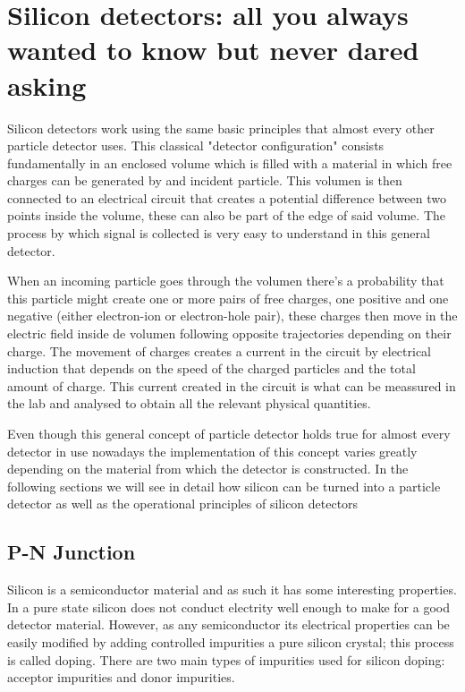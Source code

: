 \chapter{Silicon detectors: all you always wanted to know but never dared asking} %
\label{cha:simulator_development}

Silicon detectors work using the same basic principles that almost every other particle detector uses. This classical "detector configuration" consists fundamentally in an enclosed volume which is filled with a material in which free charges can be generated by and incident particle. This volumen is then connected to an electrical circuit that creates a  potential difference between two points inside the volume, these can also be part of the edge of said volume. The process by which signal is collected is very easy to understand in this general detector.

When an incoming particle goes through the volumen there's a probability that this particle might create one or more pairs of free charges, one positive and one negative (either electron-ion or electron-hole pair), these charges then move in the electric field inside de volumen following opposite trajectories depending on their charge. The movement of charges creates a current in the circuit by electrical induction that depends on the speed of the charged particles and the total amount of charge. This current created in the circuit is what can be meassured in the lab and analysed to obtain all the relevant physical quantities.

Even though this general concept of particle detector holds true for almost every detector in use nowadays the implementation of this concept varies greatly depending on the material from which the detector is constructed. In the following sections we will see in detail how silicon can be turned into a particle detector as well as the operational principles of silicon detectors

\section{P-N Junction}

Silicon is a semiconductor material and as such it has some interesting properties. In a pure state silicon does not conduct electrity well enough to make for a good detector material. However, as any semiconductor its electrical properties can be easily modified by adding controlled impurities a pure silicon crystal; this process is called doping. There are two main types of impurities used for silicon doping: acceptor impurities and donor impurities.

